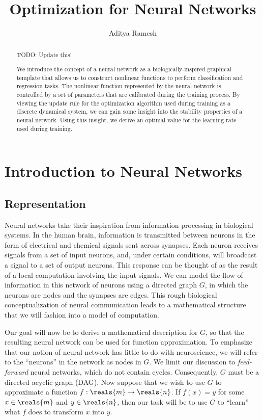 \documentclass[11pt,a4paper]{article}
\title{Optimization for Neural Networks}
\author{Aditya Ramesh}
\date{}
\numberwithin{equation}{section}
\begin{document}
\maketitle
\begin{abstract}
TODO: Update this!

We introduce the concept of a neural network as a biologically-inspired
graphical template that allows us to construct nonlinear functions to perform
classification and regression tasks. The nonlinear function represented by the
neural network is controlled by a set of parameters that are calibrated during
the training process. By viewing the update rule for the optimization algorithm
used during training as a discrete dynamical system, we can gain some insight
into the stability properties of a neural network. Using this insight, we derive
an optimal value for the learning rate used during training.
\end{abstract}

\section{Introduction to Neural Networks}
\subsection{Representation}

Neural networks take their inspiration from information processing in biological
systems. In the human brain, information is transmitted between neurons in the
form of electrical and chemical signals sent across synapses. Each neuron
receives signals from a set of input neurons, and, under certain conditions,
will broadcast a signal to a set of output neurons. This response can be thought
of as the result of a local computation involving the input signals. We can
model the flow of information in this network of neurons using a directed graph
$G$, in which the neurons are nodes and the synapses are edges. This rough
biological conceptualization of neural communication leads to a mathematical
structure that we will fashion into a model of computation.

Our goal will now be to derive a mathematical description for $G$, so that the
resulting neural network can be used for function approximation. To emphasize
that our notion of neural network has little to do with neuroscience, we will
refer to the ``neurons'' in the network as nodes in $G$. We limit our discussion
to \emph{feed-forward} neural networks, which do not contain cycles.
Consequently, $G$ must be a directed acyclic graph (DAG). Now suppose that we
wish to use $G$ to approximate a function $f: \reals{m} \to \reals{n}$. If $f(x)
= y$ for some $x \in \reals{m}$ and $y \in \reals{n}$, then our task will be to
use $G$ to ``learn'' what $f$ does to transform $x$ into $y$.
\end{document}
